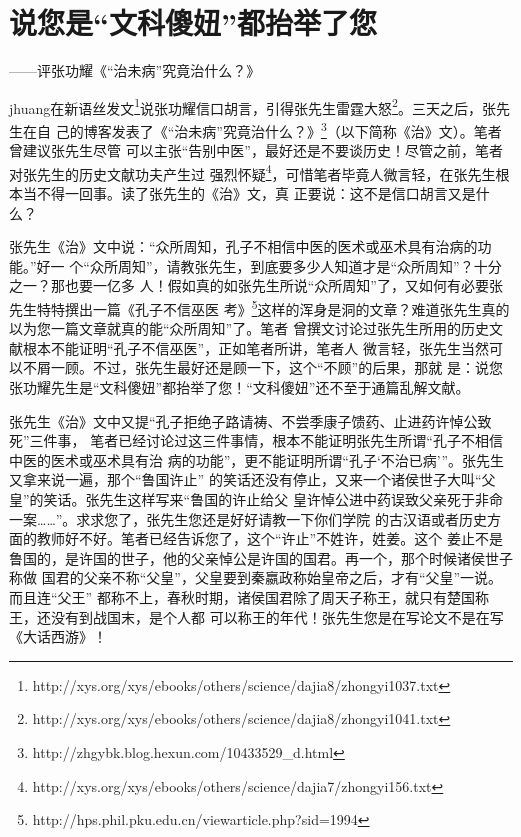 \section{说您是“文科傻妞”都抬举了您}
\centerline{
	\yuesong ——评张功耀《“治未病”究竟治什么？》
}

\mbox{}

jhuang在新语丝发文\footnote{http://xys.org/xys/ebooks/others/science/dajia8/zhongyi1037.txt}说张功耀信口胡言，引得张先生雷霆大怒\footnote{http://xys.org/xys/ebooks/others/science/dajia8/zhongyi1041.txt}。三天之后，张先生在自
己的博客发表了《“治未病”究竟治什么？》\footnote{http://zhgybk.blog.hexun.com/10433529\_d.html}（以下简称《治》文）。笔者曾建议张先生尽管
可以主张“告别中医”，最好还是不要谈历史！尽管之前，笔者对张先生的历史文献功夫产生过
强烈怀疑\footnote{http://xys.org/xys/ebooks/others/science/dajia7/zhongyi156.txt}，可惜笔者毕竟人微言轻，在张先生根本当不得一回事。读了张先生的《治》文，真
正要说：这不是信口胡言又是什么？

张先生《治》文中说：“众所周知，孔子不相信中医的医术或巫术具有治病的功能。”好一
个“众所周知”，请教张先生，到底要多少人知道才是“众所周知”？十分之一？那也要一亿多
人！假如真的如张先生所说“众所周知”了，又如何有必要张先生特特撰出一篇《孔子不信巫医
考》\footnote{http://hps.phil.pku.edu.cn/viewarticle.php?sid=1994}这样的浑身是洞的文章？难道张先生真的以为您一篇文章就真的能“众所周知”了。笔者
曾撰文讨论过张先生所用的历史文献根本不能证明“孔子不信巫医”，正如笔者所讲，笔者人
微言轻，张先生当然可以不屑一顾。不过，张先生最好还是顾一下，这个“不顾”的后果，那就
是：说您张功耀先生是“文科傻妞”都抬举了您！“文科傻妞”还不至于通篇乱解文献。

张先生《治》文中又提“孔子拒绝子路请祷、不尝季康子馈药、止进药许悼公致死”三件事，
笔者已经讨论过这三件事情，根本不能证明张先生所谓“孔子不相信中医的医术或巫术具有治
病的功能”，更不能证明所谓“孔子‘不治已病’”。张先生又拿来说一遍，那个“鲁国许止”
的笑话还没有停止，又来一个诸侯世子大叫“父皇”的笑话。张先生这样写来“鲁国的许止给父
皇许悼公进中药误致父亲死于非命一案……”。求求您了，张先生您还是好好请教一下你们学院
的古汉语或者历史方面的教师好不好。笔者已经告诉您了，这个“许止”不姓许，姓姜。这个
姜止不是鲁国的，是许国的世子，他的父亲悼公是许国的国君。再一个，那个时候诸侯世子称做
国君的父亲不称“父皇”，父皇要到秦嬴政称始皇帝之后，才有“父皇”一说。而且连“父王”
都称不上，春秋时期，诸侯国君除了周天子称王，就只有楚国称王，还没有到战国末，是个人都
可以称王的年代！张先生您是在写论文不是在写《大话西游》！

